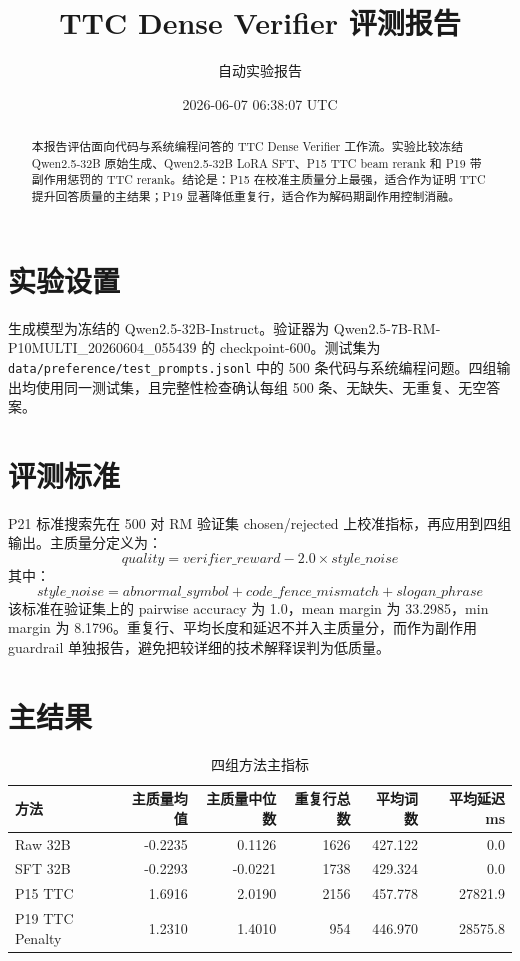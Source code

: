 \documentclass[UTF8]{ctexart}
\title{TTC Dense Verifier 评测报告}
\author{自动实验报告}
\date{2026-06-07 06:38:07 UTC}
\begin{document}
\maketitle

\begin{abstract}
本报告评估面向代码与系统编程问答的 TTC Dense Verifier 工作流。实验比较冻结 Qwen2.5-32B 原始生成、Qwen2.5-32B LoRA SFT、P15 TTC beam rerank 和 P19 带副作用惩罚的 TTC rerank。结论是：P15 在校准主质量分上最强，适合作为证明 TTC 提升回答质量的主结果；P19 显著降低重复行，适合作为解码期副作用控制消融。
\end{abstract}

\section{实验设置}
生成模型为冻结的 Qwen2.5-32B-Instruct。验证器为 Qwen2.5-7B-RM-P10MULTI\_20260604\_055439 的 checkpoint-600。测试集为 \texttt{data/preference/test\_prompts.jsonl} 中的 500 条代码与系统编程问题。四组输出均使用同一测试集，且完整性检查确认每组 500 条、无缺失、无重复、无空答案。

\section{评测标准}
P21 标准搜索先在 500 对 RM 验证集 chosen/rejected 上校准指标，再应用到四组输出。主质量分定义为：
\[
quality = verifier\_reward - 2.0 \times style\_noise
\]
其中：
\[
style\_noise = abnormal\_symbol + code\_fence\_mismatch + slogan\_phrase
\]
该标准在验证集上的 pairwise accuracy 为 1.0，mean margin 为 33.2985，min margin 为 8.1796。重复行、平均长度和延迟不并入主质量分，而作为副作用 guardrail 单独报告，避免把较详细的技术解释误判为低质量。

\section{主结果}
\begin{table}[H]
\centering
\caption{四组方法主指标}
\begin{tabular}{lrrrrr}
\toprule
方法 & 主质量均值 & 主质量中位数 & 重复行总数 & 平均词数 & 平均延迟 ms \\
\midrule
Raw 32B & -0.2235 & 0.1126 & 1626 & 427.122 & 0.0 \\
SFT 32B & -0.2293 & -0.0221 & 1738 & 429.324 & 0.0 \\
P15 TTC & 1.6916 & 2.0190 & 2156 & 457.778 & 27821.9 \\
P19 TTC Penalty & 1.2310 & 1.4010 & 954 & 446.970 & 28575.8 \\
\bottomrule
\end{tabular}
\end{table}
\end{document}
